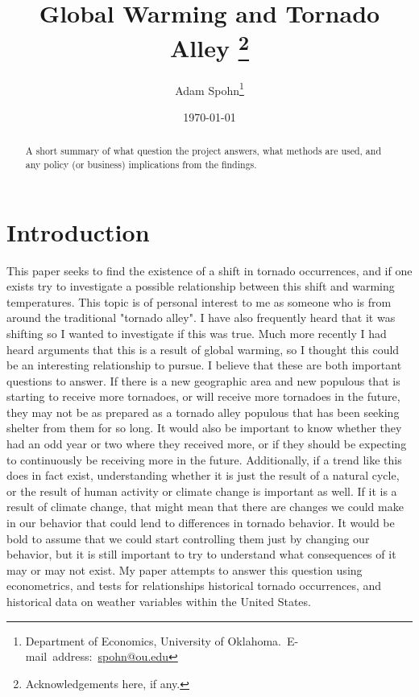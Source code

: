 \documentclass[12pt,english]{article}
\begin{document}
\begin{singlespace}
\title{Global Warming and Tornado Alley
\thanks{Acknowledgements here, if any.}}
\end{singlespace}

\author{Adam Spohn\thanks{Department of Economics, University of Oklahoma.\
E-mail~address:~\href{mailto:spohn@ou.edu}{spohn@ou.edu}}}

\date{\today}

\maketitle

\begin{abstract}
\begin{singlespace}
A short summary of what question the project answers, what methods are used, and any policy (or business) implications from the findings.
\end{singlespace}

\end{abstract}
\vfill{}


\pagebreak{}


\section{Introduction}\label{sec:intro}
\hspace{1cm} This paper seeks to find the existence of a shift in tornado occurrences, and if one exists try to investigate a possible relationship between this shift and warming temperatures. This topic is of personal interest to me as someone who is from around the traditional "tornado alley". I have also frequently heard that it was shifting so I wanted to investigate if this was true. Much more recently I had heard arguments that this is a result of global warming, so I thought this could be an interesting relationship to pursue. I believe that these are both important questions to answer. If there is a new geographic area and new populous that is starting to receive more tornadoes, or will receive more tornadoes in the future, they may not be as prepared as a tornado alley populous that has been seeking shelter from them for so long. It would also be important to know whether they had an odd year or two where they received more, or if they should be expecting to continuously be receiving more in the future. Additionally, if a trend like this does in fact exist, understanding whether it is just the result of a natural cycle, or the result of human activity or climate change is important as well. If it is a result of climate change, that might mean that there are changes we could make in our behavior that could lend to differences in tornado behavior. It would be bold to assume that we could start controlling them just by changing our behavior, but it is still important to try to understand what consequences of it may or may not exist. My paper attempts to answer this question using econometrics, and tests for relationships historical tornado occurrences, and historical data on weather variables within the United States. 
\end{document}
